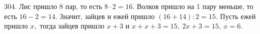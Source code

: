 304. Лис пришло 8 пар, то есть $8\cdot2=16.$ Волков пришло на 1 пару меньше, то есть $16-2=14.$ Значит, зайцев и ежей пришло $(16+14):2=15.$ Пусть ежей пришло $x,$ тогда зайцев пришло $x+3$ и $x+x+3=15,\ 2x+3=15,\ x=6.$\\
